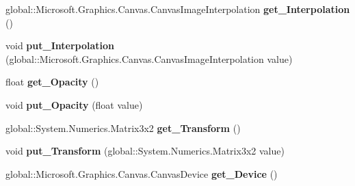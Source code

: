 \begin{DoxyCompactItemize}
global\+::\+Microsoft.\+Graphics.\+Canvas.\+Canvas\+Image\+Interpolation {\bfseries get\+\_\+\+Interpolation} ()
\item 
\mbox{\label{class_microsoft_1_1_graphics_1_1_canvas_1_1_brushes_1_1_canvas_image_brush_a733530cfb4590949e1eddf304a9e861f}} 
void {\bfseries put\+\_\+\+Interpolation} (global\+::\+Microsoft.\+Graphics.\+Canvas.\+Canvas\+Image\+Interpolation value)
\item 
\mbox{\label{class_microsoft_1_1_graphics_1_1_canvas_1_1_brushes_1_1_canvas_image_brush_afaed5d2ea1294c742aa83915f761c1de}} 
float {\bfseries get\+\_\+\+Opacity} ()
\item 
\mbox{\label{class_microsoft_1_1_graphics_1_1_canvas_1_1_brushes_1_1_canvas_image_brush_a027949e4f2b38847ed4732614740696b}} 
void {\bfseries put\+\_\+\+Opacity} (float value)
\item 
\mbox{\label{class_microsoft_1_1_graphics_1_1_canvas_1_1_brushes_1_1_canvas_image_brush_aecf3140564df93caed075a2657fac1ee}} 
global\+::\+System.\+Numerics.\+Matrix3x2 {\bfseries get\+\_\+\+Transform} ()
\item 
\mbox{\label{class_microsoft_1_1_graphics_1_1_canvas_1_1_brushes_1_1_canvas_image_brush_aacd3a10615ba452348d129139e6f0c68}} 
void {\bfseries put\+\_\+\+Transform} (global\+::\+System.\+Numerics.\+Matrix3x2 value)
\item 
\mbox{\label{class_microsoft_1_1_graphics_1_1_canvas_1_1_brushes_1_1_canvas_image_brush_abbc8ded9bdef5ad7ab6029fa7bc1eef6}} 
global\+::\+Microsoft.\+Graphics.\+Canvas.\+Canvas\+Device {\bfseries get\+\_\+\+Device} ()
\item 
\mbox{\label{class_microsoft_1_1_graphics_1_1_canvas_1_1_brushes_1_1_canvas_image_brush_acbfe907c1015a95d93b5213836119f03}} 

\end{DoxyCompactItemize}
